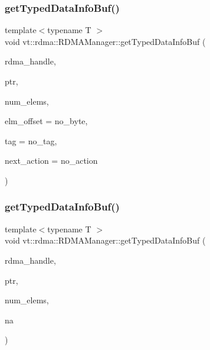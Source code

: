 \subsubsection{\texorpdfstring{get\+Typed\+Data\+Info\+Buf()}{getTypedDataInfoBuf()}\hspace{0.1cm}{\footnotesize\ttfamily [1/2]}}
{\footnotesize\ttfamily template$<$typename T $>$ \\
void vt\+::rdma\+::\+R\+D\+M\+A\+Manager\+::get\+Typed\+Data\+Info\+Buf (\begin{DoxyParamCaption}\item[{\hyperlink{namespacevt_a10442579ec4e7ebef223818e64bcf908}{R\+D\+M\+A\+\_\+\+Handle\+Type} const \&}]{rdma\+\_\+handle,  }\item[{T}]{ptr,  }\item[{\hyperlink{namespacevt_aab8d55968084610ce3b17057981e9300}{Byte\+Type} const \&}]{num\+\_\+elems,  }\item[{\hyperlink{namespacevt_aab8d55968084610ce3b17057981e9300}{Byte\+Type} const \&}]{elm\+\_\+offset = {\ttfamily no\+\_\+byte},  }\item[{\hyperlink{namespacevt_a84ab281dae04a52a4b243d6bf62d0e52}{Tag\+Type} const \&}]{tag = {\ttfamily no\+\_\+tag},  }\item[{\hyperlink{namespacevt_ae0a5a7b18cc99d7b732cb4d44f46b0f3}{Action\+Type}}]{next\+\_\+action = {\ttfamily no\+\_\+action} }\end{DoxyParamCaption})\hspace{0.3cm}{\ttfamily [inline]}}

\mbox{\label{structvt_1_1rdma_1_1_r_d_m_a_manager_a59f4ee000f6c382289fa6c186962d1d1}} 
\subsubsection{\texorpdfstring{get\+Typed\+Data\+Info\+Buf()}{getTypedDataInfoBuf()}\hspace{0.1cm}{\footnotesize\ttfamily [2/2]}}
{\footnotesize\ttfamily template$<$typename T $>$ \\
void vt\+::rdma\+::\+R\+D\+M\+A\+Manager\+::get\+Typed\+Data\+Info\+Buf (\begin{DoxyParamCaption}\item[{\hyperlink{namespacevt_a10442579ec4e7ebef223818e64bcf908}{R\+D\+M\+A\+\_\+\+Handle\+Type} const \&}]{rdma\+\_\+handle,  }\item[{T}]{ptr,  }\item[{\hyperlink{namespacevt_aab8d55968084610ce3b17057981e9300}{Byte\+Type} const \&}]{num\+\_\+elems,  }\item[{\hyperlink{namespacevt_ae0a5a7b18cc99d7b732cb4d44f46b0f3}{Action\+Type}}]{na }\end{DoxyParamCaption})\hspace{0.3cm}{\ttfamily [inline]}}


